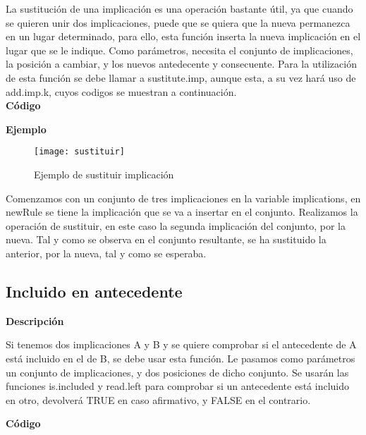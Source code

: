     La sustituci\'on de una implicaci\'on es una operaci\'on bastante \'util, ya que cuando se quieren unir dos implicaciones, puede que 
    se quiera que la nueva permanezca en un lugar determinado, para ello, esta funci\'on inserta la nueva implicaci\'on en el lugar que 
    se le indique. Como par\'ametros, necesita el conjunto de implicaciones, la posici\'on a cambiar, y los nuevos antedecente y consecuente.
    Para la utilizaci\'on de esta funci\'on se debe llamar a sustitute.imp, aunque esta, a su vez har\'a uso de add.imp.k, cuyos codigos se 
    muestran a continuaci\'on.
    \\


    \textbf{C\'odigo}

    

    
    \clearpage

    \textbf{Ejemplo}

    \begin{figure}[H]
        \centering
        \texttt{[image: sustituir]}
        \caption{Ejemplo de sustituir implicaci\'on}
        \label{fig:sustituir}
    \end{figure}

    Comenzamos con un conjunto de tres implicaciones en la variable implications, en newRule se tiene la implicaci\'on que se va 
    a insertar en el conjunto. Realizamos la operaci\'on de sustituir, en este caso la segunda implicaci\'on del conjunto, por la nueva. 
    Tal y como se observa en el conjunto resultante, se ha sustituido la anterior, por la nueva, tal y como se esperaba.


\subsection{Incluido en antecedente}

    \textbf{Descripci\'on}

    Si tenemos dos implicaciones A y B y se quiere comprobar si el antecedente de A est\'a incluido en el de B, se debe usar 
    esta funci\'on. Le pasamos como par\'ametros un conjunto de implicaciones, y dos posiciones de dicho conjunto. Se usar\'an 
    las funciones is.included y read.left para comprobar si un antecedente est\'a incluido en otro, devolver\'a TRUE en caso 
    afirmativo, y FALSE en el contrario.
    \\
    \clearpage

    \textbf{C\'odigo}

